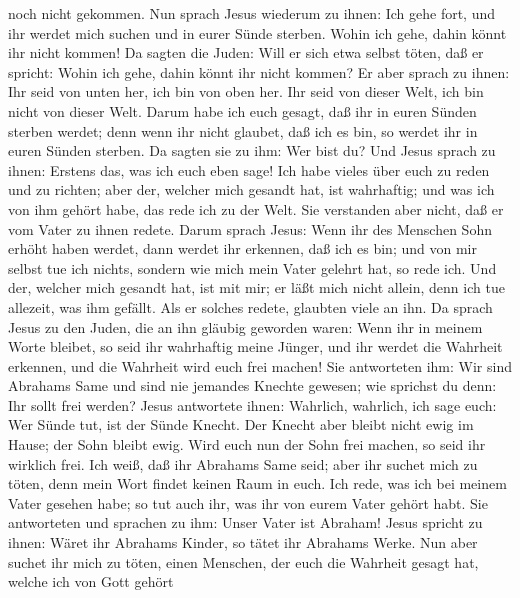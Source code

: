 noch nicht gekommen.  Nun sprach Jesus wiederum zu ihnen:
Ich gehe fort, und ihr werdet mich suchen und in eurer Sünde sterben.
Wohin ich gehe, dahin könnt ihr nicht kommen!  Da sagten
die Juden: Will er sich etwa selbst töten, daß er spricht: Wohin ich
gehe, dahin könnt ihr nicht kommen?  Er aber sprach zu
ihnen: Ihr seid von unten her, ich bin von oben her. Ihr seid von dieser
Welt, ich bin nicht von dieser Welt.  Darum habe ich euch
gesagt, daß ihr in euren Sünden sterben werdet; denn wenn ihr nicht
glaubet, daß ich es bin, so werdet ihr in euren Sünden sterben.
 Da sagten sie zu ihm: Wer bist du? Und Jesus sprach zu
ihnen: Erstens das, was ich euch eben sage!  Ich habe
vieles über euch zu reden und zu richten; aber der, welcher mich gesandt
hat, ist wahrhaftig; und was ich von ihm gehört habe, das rede ich zu
der Welt.  Sie verstanden aber nicht, daß er vom Vater zu
ihnen redete.  Darum sprach Jesus: Wenn ihr des Menschen
Sohn erhöht haben werdet, dann werdet ihr erkennen, daß ich es bin; und
von mir selbst tue ich nichts, sondern wie mich mein Vater gelehrt hat,
so rede ich.  Und der, welcher mich gesandt hat, ist mit
mir; er läßt mich nicht allein, denn ich tue allezeit, was ihm gefällt.
 Als er solches redete, glaubten viele an ihn.
 Da sprach Jesus zu den Juden, die an ihn gläubig
geworden waren: Wenn ihr in meinem Worte bleibet, so seid ihr wahrhaftig
meine Jünger,  und ihr werdet die Wahrheit erkennen, und
die Wahrheit wird euch frei machen!  Sie antworteten ihm:
Wir sind Abrahams Same und sind nie jemandes Knechte gewesen; wie
sprichst du denn: Ihr sollt frei werden?  Jesus
antwortete ihnen: Wahrlich, wahrlich, ich sage euch: Wer Sünde tut, ist
der Sünde Knecht.  Der Knecht aber bleibt nicht ewig im
Hause; der Sohn bleibt ewig.  Wird euch nun der Sohn frei
machen, so seid ihr wirklich frei.  Ich weiß, daß ihr
Abrahams Same seid; aber ihr suchet mich zu töten, denn mein Wort findet
keinen Raum in euch.  Ich rede, was ich bei meinem Vater
gesehen habe; so tut auch ihr, was ihr von eurem Vater gehört habt.
 Sie antworteten und sprachen zu ihm: Unser Vater ist
Abraham! Jesus spricht zu ihnen: Wäret ihr Abrahams Kinder, so tätet ihr
Abrahams Werke.  Nun aber suchet ihr mich zu töten, einen
Menschen, der euch die Wahrheit gesagt hat, welche ich von Gott gehört
